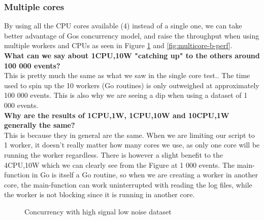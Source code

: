 \subsubsection{Multiple cores}

By using all the CPU cores available (4) instead of a single one, we can take better advantage of Gos concurrency model, and raise the throughput when using multiple workers and CPUs as seen in Figure \cref{fig:multicore-hsln-perf} and \cref{fig:multicore-b-perf}.\\
\textbf{What can we say about 1CPU,10W "catching up" to the others around 100 000 events?}\\
This is pretty much the same as what we saw in the single core test.. The time used to spin up the 10 workers (Go routines) is only outweighed at approximately 100 000 events. This is also why we are seeing a dip when using a dataset of 1 000 events.\\
\textbf{Why are the results of 1CPU,1W, 1CPU,10W and 10CPU,1W generally the same?}\\
This is because they in general are the same. When we are limiting our script to 1 worker, it doesn't really matter how many cores we use, as only one core will be running the worker regardless. There is however a slight benefit to the 4CPU,10W which we can clearly see from the Figure at 1 000 events. The main-function in Go is itself a Go routine, so when we are creating a worker in another core, the main-function can work uninterrupted with reading the log files, while the worker is not blocking since it is running in another core.

\begin{figure}[ht]
\centering
\pgfplotsset{scaled y ticks=false}
\caption{Concurrency with high signal low noise dataset}
\label{fig:multicore-hsln-perf}
\end{figure}

